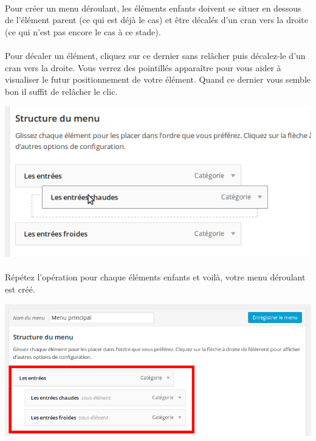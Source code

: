 \documentclass[10pt,a4paper]{article}
\begin{document}
\paragraph{}Pour créer un menu déroulant, les éléments enfants doivent se situer en dessous de l'élément parent (ce qui est déjà le cas) et être décalés d'un cran vers la droite (ce qui n'est pas encore le cas à ce stade).
\paragraph{}Pour décaler un élément, cliquez sur ce dernier sans relâcher puis décalez-le d'un cran vers la droite. Vous verrez des pointillés apparaître pour vous aider à visualiser le futur positionnement de votre élément. Quand ce dernier vous semble bon il suffit de relâcher le clic.
\begin{center}
\includegraphics[scale=0.3]{img/0154.png}
\end{center}
\paragraph{}Répétez l'opération pour chaque éléments enfants et voilà, votre menu déroulant est créé.
\begin{center}
\includegraphics[scale=0.3]{img/0155.png}
\end{center}
\newpage
\end{document}

